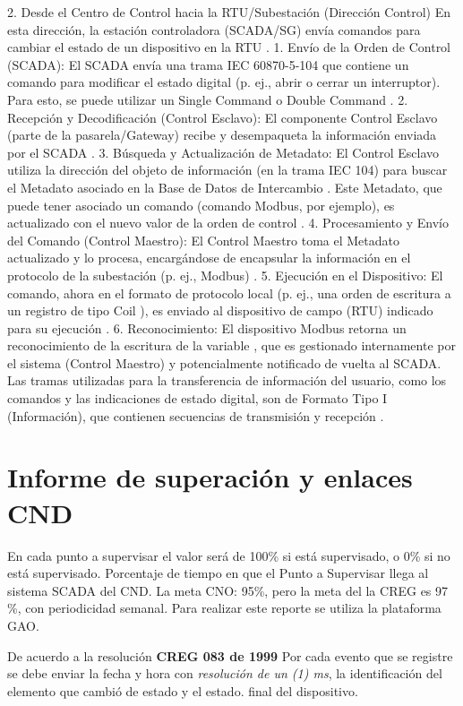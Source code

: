 \documentclass[a5paper]{book}%
\begin{document}
2. Desde el Centro de Control hacia la RTU/Subestación (Dirección Control)
En esta dirección, la estación controladora (SCADA/SG) envía comandos para cambiar el estado de un dispositivo en la RTU
.
1. Envío de la Orden de Control (SCADA): El SCADA envía una trama IEC 60870-5-104 que contiene un comando para modificar el estado digital (p. ej., abrir o cerrar un interruptor). Para esto, se puede utilizar un Single Command o Double Command
.
2. Recepción y Decodificación (Control Esclavo): El componente Control Esclavo (parte de la pasarela/Gateway) recibe y desempaqueta la información enviada por el SCADA
.
3. Búsqueda y Actualización de Metadato: El Control Esclavo utiliza la dirección del objeto de información (en la trama IEC 104) para buscar el Metadato asociado en la Base de Datos de Intercambio
. Este Metadato, que puede tener asociado un comando (comando Modbus, por ejemplo), es actualizado con el nuevo valor de la orden de control
.
4. Procesamiento y Envío del Comando (Control Maestro): El Control Maestro toma el Metadato actualizado y lo procesa, encargándose de encapsular la información en el protocolo de la subestación (p. ej., Modbus)
.
5. Ejecución en el Dispositivo: El comando, ahora en el formato de protocolo local (p. ej., una orden de escritura a un registro de tipo Coil
), es enviado al dispositivo de campo (RTU) indicado para su ejecución
.
6. Reconocimiento: El dispositivo Modbus retorna un reconocimiento de la escritura de la variable
, que es gestionado internamente por el sistema (Control Maestro) y potencialmente notificado de vuelta al SCADA.
Las tramas utilizadas para la transferencia de información del usuario, como los comandos y las indicaciones de estado digital, son de Formato Tipo I (Información), que contienen secuencias de transmisión y recepción
.

  \section{Informe de superación y enlaces CND}

  En cada punto a supervisar el valor será de 100\% si está supervisado, o 0\% si no está supervisado. Porcentaje de tiempo en que el Punto a Supervisar llega al sistema SCADA del CND. La meta CNO: 95\%, pero la meta del la CREG es 97 \%,  con periodicidad semanal. Para realizar este reporte se utiliza la plataforma GAO.


  
  De acuerdo a la resolución \textbf{CREG 083 de 1999} Por cada evento que se registre se debe enviar la fecha y hora con \textit{resolución de un (1) ms}, la identificación del elemento que cambió de estado y el estado. final del dispositivo.\\\\
\end{document}
